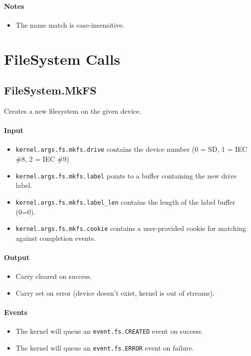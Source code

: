 \paragraph{Notes}
\begin{itemize}
\item The name match is case-insensitive.
\end{itemize}


\section*{FileSystem Calls}

\subsection*{FileSystem.MkFS}
Creates a new filesystem on the given device.

\paragraph{Input}
\begin{itemize}
\item \verb+kernel.args.fs.mkfs.drive+ contains the device number (0 = SD, 1 = IEC \#8, 2 = IEC \#9)
\item \verb+kernel.args.fs.mkfs.label+ points to a buffer containing the new drive label.
\item \verb+kernel.args.fs.mkfs.label_len+ contains the length of the label buffer (0=0).
\item \verb+kernel.args.fs.mkfs.cookie+ contains a user-provided cookie for matching against completion events.
\end{itemize}

\paragraph{Output}
\begin{itemize}
\item Carry cleared on success.
\item Carry set on error (device doesn't exist, kernel is out of streams).
\end{itemize}

\paragraph{Events}
\begin{itemize}
\item The kernel will queue an \verb+event.fs.CREATED+ event on success.
\item The kernel will queue an \verb+event.fs.ERROR+ event on failure.
\end{itemize}

